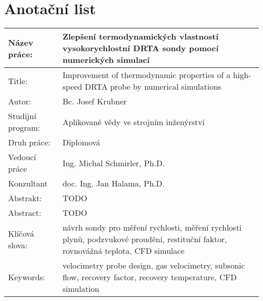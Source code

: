 \thispagestyle{empty}
\section*{Anotační list}
\def\arraystretch{2}%
\begin{table}[ht!]
    \centering
    \begin{tabular}{p{}|p{}}
    Název práce: & Zlepšení termodynamických vlastností vysokorychlostní DRTA sondy pomocí numerických simulací \\ \hline
    Title: & Improvement of thermodynamic properties of a high-speed DRTA probe by numerical simulations \\ \hline
    Autor: & Bc. Josef Krubner \\ \hline
    Studijní program: & Aplikované vědy ve strojním inženýrství \\ \hline
    Druh práce: & Diplomová \\ \hline
    Vedoucí práce & Ing. Michal Schmirler, Ph.D. \\ \hline
    Konzultant & doc. Ing. Jan Halama, Ph.D. \\ \hline
    Abstrakt: & TODO \\ \hline
    Abstract: & TODO \\ \hline
    Klíčová slova: & návrh sondy pro měření rychlosti, měření rychlosti plynů, podzvukové proudění, restituční faktor, rovnovážná teplota, CFD simulace\\ \hline
    Keywords: & velocimetry probe design, gas velocimetry, subsonic flow, recovery factor, recovery temperature, CFD simulation
    \end{tabular}
\end{table}
\def\arraystretch{1}%